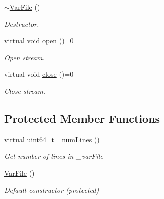 \begin{DoxyCompactItemize}
\mbox{\label{classvarfiles_1_1_var_file_a6cb154a5c37a2c81e9a5c653dc7ab3f6}} 
\hyperlink{classvarfiles_1_1_var_file_a6cb154a5c37a2c81e9a5c653dc7ab3f6}{$\sim$\+Var\+File} ()
\begin{DoxyCompactList}\small\item\em Destructor. \end{DoxyCompactList}\item 
\mbox{\label{classvarfiles_1_1_var_file_a360a59090988d582fe94c25d6f674e3b}} 
virtual void \hyperlink{classvarfiles_1_1_var_file_a360a59090988d582fe94c25d6f674e3b}{open} ()=0
\begin{DoxyCompactList}\small\item\em Open stream. \end{DoxyCompactList}\item 
\mbox{\label{classvarfiles_1_1_var_file_a2a4a4e95f009c4d1281e4212f4fdce1d}} 
virtual void \hyperlink{classvarfiles_1_1_var_file_a2a4a4e95f009c4d1281e4212f4fdce1d}{close} ()=0
\begin{DoxyCompactList}\small\item\em Close stream. \end{DoxyCompactList}\end{DoxyCompactItemize}
\subsection*{Protected Member Functions}
\begin{DoxyCompactItemize}
\item 
virtual uint64\+\_\+t \hyperlink{classvarfiles_1_1_var_file_a029a1a5577fb735c338750d2dec62ab6}{\+\_\+num\+Lines} ()
\begin{DoxyCompactList}\small\item\em Get number of lines in {\ttfamily \+\_\+var\+File} \end{DoxyCompactList}\item 
\mbox{\label{classvarfiles_1_1_var_file_ab2f106631e30441791c73e8c4bc846a0}} 
\hyperlink{classvarfiles_1_1_var_file_ab2f106631e30441791c73e8c4bc846a0}{Var\+File} ()
\begin{DoxyCompactList}\small\item\em Default constructor (protected) \end{DoxyCompactList}\end{DoxyCompactItemize}
